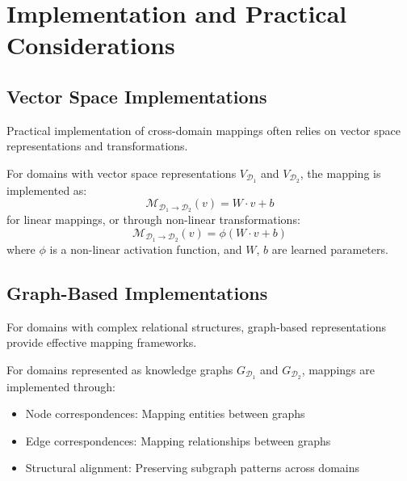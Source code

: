 \section{Implementation and Practical Considerations}

\subsection{Vector Space Implementations}

Practical implementation of cross-domain mappings often relies on vector space representations and transformations.

\begin{definition}
For domains with vector space representations $V_{\mathcal{D}_1}$ and $V_{\mathcal{D}_2}$, the mapping is implemented as:
\begin{equation}
\mathcal{M}_{\mathcal{D}_1 \rightarrow \mathcal{D}_2}(v) = W \cdot v + b
\end{equation}
for linear mappings, or through non-linear transformations:
\begin{equation}
\mathcal{M}_{\mathcal{D}_1 \rightarrow \mathcal{D}_2}(v) = \phi(W \cdot v + b)
\end{equation}
where $\phi$ is a non-linear activation function, and $W$, $b$ are learned parameters.
\end{definition}

\subsection{Graph-Based Implementations}

For domains with complex relational structures, graph-based representations provide effective mapping frameworks.

\begin{definition}
For domains represented as knowledge graphs $G_{\mathcal{D}_1}$ and $G_{\mathcal{D}_2}$, mappings are implemented through:
\begin{itemize}
    \item Node correspondences: Mapping entities between graphs
    \item Edge correspondences: Mapping relationships between graphs
    \item Structural alignment: Preserving subgraph patterns across domains
\end{itemize}
\end{definition}

